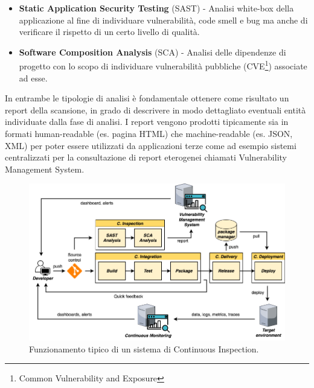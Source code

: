 \begin{itemize}
    \item \textbf{Static Application Security Testing} (SAST) - Analisi white-box della applicazione al fine di individuare vulnerabilità, code smell e bug ma anche di verificare il rispetto di un certo livello di qualità.
    \item \textbf{Software Composition Analysis} (SCA) - Analisi delle dipendenze di progetto con lo scopo di individuare vulnerabilità pubbliche (CVE\footnote{Common Vulnerability and Exposure}) associate ad esse.
\end{itemize}

In entrambe le tipologie di analisi è fondamentale ottenere come risultato un report della scansione, in grado di descrivere in modo dettagliato eventuali entità individuate dalla fase di analisi. I report vengono prodotti tipicamente sia in formati human-readable (es. pagina HTML) che machine-readable (es. JSON, XML) per poter essere utilizzati da applicazioni terze come ad esempio sistemi centralizzati per la consultazione di report eterogenei chiamati Vulnerability Management System.

\begin{figure}[H]
    \centering
    \includegraphics[width=1\textwidth]{img/cinspection-pipeline.png}
    \caption{Funzionamento tipico di un sistema di Continuous Inspection.}
    \label{ci-inspection-pipeline}
\end{figure}

